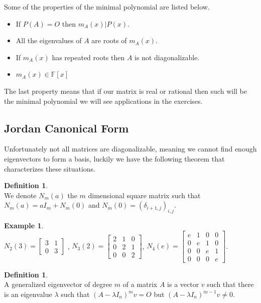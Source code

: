 \documentclass[12pt]{article}
\theoremstyle{definition}
\newtheorem{definition}[theorem]{Definition}
\newtheorem*{example}{Example}
\theoremstyle{remark}
\theoremstyle{plain}
\begin{document}
Some of the properties of the minimal polynomial are listed below.
\begin{itemize}
	\item If $P(A)=O$ then $m_A(x)|P(x)$.
	\item All the eigenvalues of $A$ are roots of $m_A(x)$.
	\item If $m_A(x)$ has repeated roots then $A$ is not diagonalizable.
	\item $m_A(x) \in \mathbb{F}[x]$
\end{itemize}
The last property means that if our matrix is real or rational then such will be the minimal polynomial we will see applications in the exercises.
\newpage
\subsection{Jordan Canonical Form}
Unfortunately not all matrices are diagonalizable, meaning we cannot find enough eigenvectors to form a basis, luckily we have the following theorem that characterizes these situations.
\begin{definition}\leavevmode \\
	We denote $N_m(a)$ the $m$ dimensional square matrix such that $N_m(a)=aI_m + N_m(0)$ and $N_m(0)=(\delta_{i+1,j})_{i,j}$.
\end{definition}
\begin{example}\leavevmode \\
$N_2(3)=\begin{bmatrix}3 & 1 \\
0 & 3  
\end{bmatrix}$
, 
$N_3(2)=\begin{bmatrix}
    2 &1&0\\
    0 &2 &1 \\
    0 & 0 &2
\end{bmatrix}$, 
$ N_4(e)=\begin{bmatrix} e & 1 & 0 & 0\\
    0 &e & 1 & 0 \\
    0 & 0 & e & 1  \\
   0 & 0 &0 &e
\end{bmatrix}$.
    
\end{example}
\begin{definition}\leavevmode \\
	A generalized eigenvector of degree $m$ of a matrix $A$ is a vector $v$ such that there is an eigenvalue $\lambda$ such that $(A-\lambda I_n)^mv=O$ but $(A-\lambda I_n)^{m-1}v\neq 0$.	
\end{definition}
\end{document}
